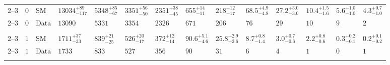 \begin{landscape}
\begin{center}
\begin{table}[h!]
\begin{tabular}{ llllllllllllll }
    \hline
    2--3                 & $0$      & SM   & $13034^{+89}_{-117}$           & $5348^{+85}_{-67}$             & $3351^{+56}_{-50}$             & $2351^{+38}_{-45}$             & $655^{+14}_{-11}$              & $218^{+12}_{-17}$              & $68.5^{+4.9}_{-4.8}$           & $27.2^{+3.0}_{-3.0}$           & $10.4^{+1.5}_{-1.6}$           & $5.6^{+1.0}_{-1.0}$            & $4.3^{+0.7}_{-1.0}$            \\ 
    2--3                 & $0$      & Data & $13090$                        & $5331$                        & $3354$                         & $2326$                         & $671$                          & $206$                          & $76$                           & $29$                           & $10$                           & $9$                            & $2$                            \\\\
    2--3                 & $1$      & SM   & $1711^{+37}_{-33}$             & $839^{+21}_{-25}$              & $526^{+20}_{-17}$              & $372^{+12}_{-14}$              & $90.6^{+5.1}_{-4.6}$           & $25.8^{+2.9}_{-2.6}$           & $8.7^{+0.8}_{-1.4}$            & $3.0^{+0.7}_{-0.6}$            & $2.2^{+0.8}_{-0.6}$            & $0.3^{+0.2}_{-0.1}$            & $0.2^{+0.1}_{-0.2}$            \\ 
    2--3                 & $1$      & Data & $1733$                         & $833$                          & $527$                          & $356$                          & $90$                           & $31$                           & $6$                            & $4$                            & $1$                            & $0$                            & $1$                            \\\\

\end{tabular}
\end{table}
\end{center}
\end{landscape}

